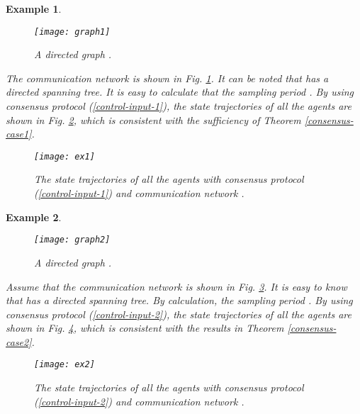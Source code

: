 \documentclass[12pt,draftcls,onecolumn]{IEEEtran}
\newtheorem{example}{Example}
\begin{document}
\begin{example}\label{ex1}
\begin{figure}[htbp]
  \centering
\texttt{[image: graph1]}\\
  \caption{A directed graph .}\label{graph-ex1}
\end{figure}


The communication network  is shown in Fig. \ref{graph-ex1}. It can be noted that  has a directed spanning tree. It is easy to calculate that the sampling period . By using consensus protocol (\ref{control-input-1}), the state trajectories of all the agents are shown in Fig. \ref{result-ex1}, which is consistent with the sufficiency of Theorem \ref{consensus-case1}.

\begin{figure}[htbp]
  \centering
\texttt{[image: ex1]}\\
  \caption{The state trajectories of all the agents with consensus protocol (\ref{control-input-1}) and communication network .}\label{result-ex1}
\end{figure}

\end{example}



\begin{example}\label{ex2}

\begin{figure}[htbp]
  \centering
\texttt{[image: graph2]}\\
  \caption{A directed graph .}\label{graph-ex2}
\end{figure}

Assume that the communication network  is shown in Fig. \ref{graph-ex2}. It is easy to know that  has a directed spanning tree. By calculation, the sampling period . By using consensus protocol (\ref{control-input-2}), the state trajectories of all the agents are shown in Fig. \ref{result-ex2}, which is consistent with the results in Theorem \ref{consensus-case2}.


\begin{figure}[htbp]
  \centering
\texttt{[image: ex2]}\\
  \caption{The state trajectories of all the agents with consensus protocol (\ref{control-input-2}) and communication network .}\label{result-ex2}
\end{figure}

\end{example}
\end{document}
